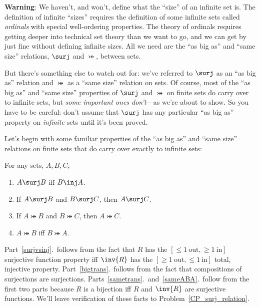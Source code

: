 \textbf{Warning}: We haven't, and won't, define what the ``size'' of
an infinite set is.  The definition of infinite ``sizes'' requires the
definition of some infinite sets called \emph{ordinals} with special
well-ordering properties.  The theory of ordinals requires getting
deeper into technical set theory than we want to go, and we can get by
just fine without defining infinite sizes.  All we need are the ``as
big as'' and ``same size'' relations, $\surj$ and $\bij$, between
sets.

But there's something else to watch out for: we've referred to $\surj$
as an ``as big as'' relation and $\bij$ as a ``same size'' relation on
sets.  Of course, most of the ``as big as'' and ``same size''
properties of $\surj$ and $\bij$ on finite sets do carry over to
infinite sets, but \emph{some important ones don't}---as we're about
to show.  So you have to be careful: don't assume that $\surj$ has any
particular ``as big as'' property on \emph{infinite} sets until it's
been proved.

Let's begin with some familiar properties of the ``as big as'' and
``same size'' relations on finite sets that do carry over exactly to
infinite sets:
\begin{lemma}\label{surjinjbij_properties}
For any sets, $A,B,C$,
\begin{enumerate}

\item \label{surjvsinj} $A \surj B$ iff $B \inj A$.

\item \label{bigtrans} If $A \surj B$ and $B \surj C$, then $A \surj
  C$.

\item \label{sametrans} If $A \bij B$ and $B \bij C$, then $A \bij C$.

\item\label{sameABA} $A \bij B$ iff $B \bij A$.
\end{enumerate}
\end{lemma}

Part~\ref{surjvsinj}.\ follows from the fact that $R$ has the $[\le
  1\ \text{out}, \ge 1\ \text{in}]$ surjective function property iff
$\inv{R}$ has the $[\ge 1\ \text{out}, \le 1\ \text{in}]$ total,
injective property.  Part~\ref{bigtrans}.\ follows from the fact that
compositions of surjections are surjections.
Parts~\ref{sametrans}.\ and~\ref{sameABA}.\ follow from the first two
parts because $R$ is a bijection iff $R$ and $\inv{R}$ are surjective
functions.  We'll leave verification of these facts to
Problem~\ref{CP_surj_relation}.

